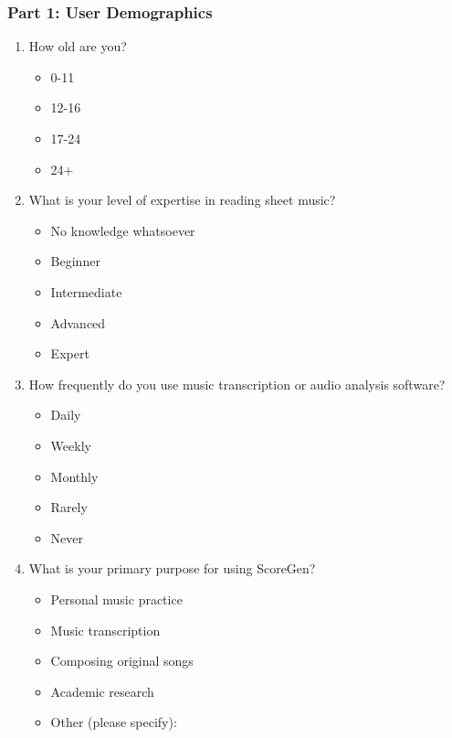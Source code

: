 \documentclass[12pt, titlepage]{article}
\begin{document}
\subsubsection*{Part 1: User Demographics}
\begin{enumerate}[leftmargin=*]
  \item How old are you?
  \begin{itemize}
    \item 0-11
    \item 12-16
    \item 17-24
    \item 24+
  \end{itemize}
  \item What is your level of expertise in reading sheet music? 
  \begin{itemize}
    \item No knowledge whatsoever
    \item Beginner
    \item Intermediate
    \item Advanced
    \item Expert
  \end{itemize}
  \item How frequently do you use music transcription or audio analysis software?
  \begin{itemize}
    \item Daily
    \item Weekly
    \item Monthly
    \item Rarely
    \item Never
  \end{itemize}
  \item What is your primary purpose for using ScoreGen?
  \begin{itemize}
    \item Personal music practice
    \item Music transcription
    \item Composing original songs
    \item Academic research
    \item Other (please specify): \hrulefill
  \end{itemize}
\end{enumerate}
\end{document}
